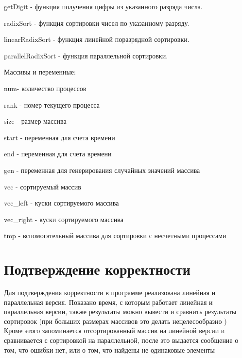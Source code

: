 \documentclass{report}
\begin{document}
getDigit - функция получения цифры из указанного разряда числа.
\par

radixSort - функция сортировки чисел по указанному разряду.
\par

linearRadixSort - функция линейной поразрядной сортировки.
\par

parallelRadixSort - функция параллельной сортировки.
\par

Массивы и переменные:
\par

num- количество процессов
\par

rank - номер текущего процесса
\par

size - размер массива
\par

start - переменная для счета времени
\par

end - переменная для счета времени
\par

gen - переменная для генерирования случайных значений массива
\par

vec - сортируемый массив
\par

vec\_left - куски сортируемого массива
\par

vec\_right - куски сортируемого массива
\par

tmp - вспомогательный массива для сортировки с несчетными процессами
\newpage

\section*{Подтверждение корректности}
Для подтверждения корректности в программе реализована линейная и
параллельная версия. Показано время, с которым работает линейная и
параллельная версии, также результаты можно вывести и сравнить
результаты сортировок (при больших размерах массивов это делать
нецелесообразно )\\
Кроме этого запоминается отсортированный массив на линейной версии и
сравнивается с сортировкой на параллельной, после это выдается сообщение
о том, что ошибки нет, или о том, что найдены не одинаковые элементы
\newpage
\end{document}
